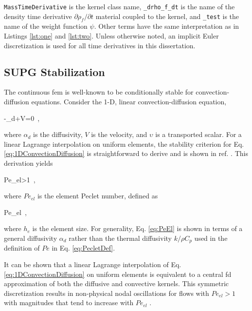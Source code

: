 \texttt{MassTimeDerivative} is the kernel class name, \texttt{\_drho\_f\_dt} is the name of the density time derivative \(\partial\rho_f/\partial t\) material coupled to the kernel, and \texttt{\_test} is the name of the weight function \(\psi\). Other terms have the same interpretation as in Listings \ref{lst:one} and \ref{lst:two}. Unless otherwise noted, an implicit Euler discretization is used for all time derivatives in this dissertation.

\subsection[Streamline Upwind Petrov-Galerkin Stabilization]{SUPG Stabilization}
\label{sec:supg}

The continuous \gls{fem} is well-known to be conditionally stable for convection-diffusion equations. Consider the 1-D, linear convection-diffusion equation,

\beq
\label{eq:1DConvectionDiffusion}
-\alpha_d+V=0\ ,
\eeq

\noindent where \(\alpha_d\) is the diffusivity, \(V\) is the velocity, and \(\upsilon\) is a transported scalar. For a linear Lagrange interpolation on uniform elements, the stability criterion for Eq. \eqref{eq:1DConvectionDiffusion} is straightforward to derive and is shown in ref. \cite{novak_manual}. This derivation yields

\beq
\label{eq:PeCriterion}
Pe_{el}>1\ ,
\eeq

\noindent where \(Pe_{el}\) is the element Peclet number, defined as

\beq
\label{eq:PeEl}
Pe_{el}\equiv{}\ ,
\eeq

\noindent where \(h_e\) is the element size. For generality, Eq. \eqref{eq:PeEl} is shown in terms of a general diffusivity \(\alpha_d\) rather than the thermal diffusivity \(k/\rho C_p\) used in the definition of \(Pe\) in Eq. \eqref{eq:PecletDef}. 

It can be shown that a linear Lagrange interpolation of Eq. \eqref{eq:1DConvectionDiffusion} on uniform elements is equivalent to a central \gls{fd} approximation of both the diffusive and convective kernels. This symmetric discretization results in non-physical nodal oscillations for flows with \(Pe_{el}>1\) with magnitudes that tend to increase with \(Pe_{el}\) \cite{novak_manual,zienkiewicz}. 


